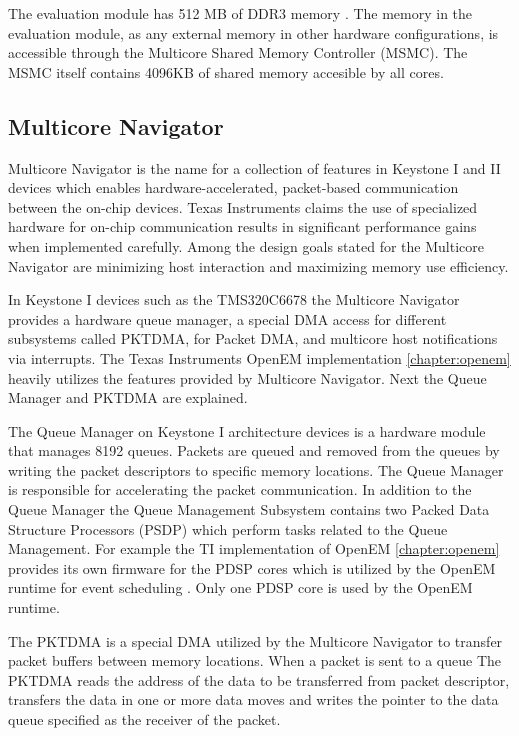 The evaluation module has 512 MB of DDR3 memory \cite{evmref}. The memory in the evaluation module, as any external memory in other hardware configurations, is accessible through the Multicore Shared Memory Controller (MSMC). The MSMC itself contains 4096KB of shared memory accesible by all cores.

\subsection{Multicore Navigator}
\label{subsec:multicorenav}
Multicore Navigator is the name for a collection of features in Keystone I and II devices which enables hardware-accelerated, packet-based communication between the on-chip devices. Texas Instruments claims the use of specialized hardware for on-chip communication results in significant performance gains when implemented carefully. Among the design goals stated for the Multicore Navigator are minimizing host interaction and maximizing memory use efficiency. \cite{navigator}

In Keystone I devices such as the TMS320C6678 the Multicore Navigator provides a hardware queue manager, a special DMA access for different subsystems called PKTDMA, for Packet DMA, and multicore host notifications via interrupts. \cite{navigator} The Texas Instruments OpenEM implementation \ref{chapter:openem} heavily utilizes the features provided by Multicore Navigator. Next the Queue Manager and PKTDMA are explained.

The Queue Manager on Keystone I architecture devices is a hardware module that manages 8192 queues. Packets are queued and removed from the queues by writing the packet descriptors to specific memory locations. The Queue Manager is responsible for accelerating the packet communication. In addition to the Queue Manager the Queue Management Subsystem contains two Packed Data Structure Processors (PSDP) which perform tasks related to the Queue Management. \cite{navigator} For example the TI implementation of OpenEM \ref{chapter:openem} provides its own firmware for the PDSP cores which is utilized by the OpenEM runtime for event scheduling \cite{openemwhite}. Only one PDSP core is used by the OpenEM runtime.

The PKTDMA is a special DMA utilized by the Multicore Navigator to transfer packet buffers between memory locations. When a packet is sent to a queue The PKTDMA reads the address of the data to be transferred from packet descriptor, transfers the data in one or more data moves and writes the pointer to the data queue specified as the receiver of the packet. \cite{navigator}

